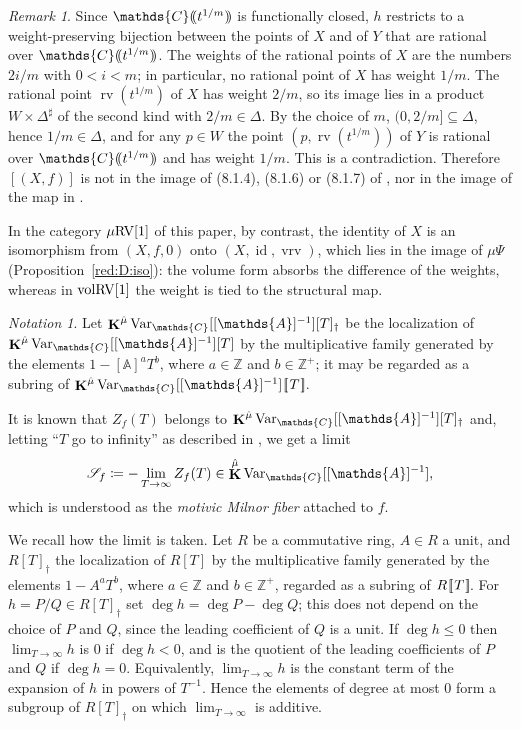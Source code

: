 \documentclass[12pt]{amsart}
\newcommand{\memph}[1]{{\color{magenta}\emph{#1}}}
\theoremstyle{plain}
\theoremstyle{definition}
\theoremstyle{remark}
\newtheorem{rem}[thm]{Remark}
\newtheorem{nota}[thm]{Notation}
\numberwithin{equation}{section}
\theoremstyle{plain}
\newcommand{\RV}{\textup{RV}}
\DeclareMathOperator{\id}{id}
\newcommand{\Z}{\mathds{Z}}
\newcommand{\A}{\mathds{A}}
\newcommand{\C}{\mathds{C}}
\newcommand{\0}{\emptyset}
\newcommand{\dbra}[1]{%
  \,[\mkern-6.8mu[\, #1 \,]\mkern-6.8mu]}
\newcommand{\dpar}[1]{%
   (\mkern-4mu (#1 )\mkern-4mu )}
\newcommand{\limplies}{\rightarrow}
\newcommand{\sub}{\subseteq}
\newcommand{\mgRV}{{\mu}{\RV}}
\DeclareMathOperator{\rv}{rv}
\DeclareMathOperator{\ggk}{\mathbf{K}}
\DeclareMathOperator{\vrv}{vrv}
\newcommand{\var}{\textup{Var}}
\newcommand{\gmv}{\ggk^{\hat \mu}\var_{\C}}
\begin{document}
\begin{rem}
Since $\C\dpar{t^{1/m}}$ is functionally closed, $h$ restricts to a weight-preserving bijection between the points of $X$ and of $Y$ that are rational over $\C\dpar{t^{1/m}}$. The weights of the rational points of $X$ are the numbers $2i/m$ with $0 < i < m$; in particular, no rational point of $X$ has weight $1/m$. The rational point $\rv(t^{1/m})$ of $X$ has weight $2/m$, so its image lies in a product $W \times \Delta^\sharp$ of the second kind with $2/m \in \Delta$. By the choice of $m$, $(0, 2/m] \sub \Delta$, hence $1/m \in \Delta$, and for any $p \in W$ the point $(p, \rv(t^{1/m}))$ of $Y$ is rational over $\C\dpar{t^{1/m}}$ and has weight $1/m$. This is a contradiction. Therefore $[(X, f)]$ is not in the image of (8.1.4), (8.1.6) or (8.1.7) of \cite{hru:loe:lef}, nor in the image of the map in \cite[Proposition~10.10(2)]{hrushovski:kazhdan:integration:vf}.

In the category $\mgRV[1]$ of this paper, by contrast, the identity of $X$ is an isomorphism from $(X, f, 0)$ onto $(X, \id, \vrv)$, which lies in the image of ${\mu}\Psi$ (Proposition~\ref{red:D:iso}): the volume form absorbs the difference of the weights, whereas in $\mathrm{vol}\RV[1]$ the weight is tied to the structural map.
\end{rem}

\begin{nota}\label{dag:loc}
Let $\gmv[[\A]^{-1}][T]_{\dag}$ be the localization of $\gmv[[\A]^{-1}][T]$ by the multiplicative family generated by the elements $1 - [\A]^{a}T^b$, where $a \in \Z$ and $b \in \Z^+$; it may be regarded as a subring of  $\gmv[[\A]^{-1}] \dbra T$.
\end{nota}

It is known that $Z_f(T)$ belongs to $\gmv[[\A]^{-1}][T]_{\dag}$ and, letting ``$T$ go to infinity'' as described in \cite[\S~8.4]{hru:loe:lef}, we get a limit
\[
\mathscr S_f \coloneqq - \lim_{T \limplies \infty} Z_f(T) \in \gmv[[\A]^{-1}],
\]
which is understood as the \memph{motivic Milnor fiber} attached to $f$.

We recall how the limit is taken. Let $R$ be a commutative ring, $A \in R$ a unit, and $R[T]_{\dag}$ the localization of $R[T]$ by the multiplicative family generated by the elements $1 - A^{a}T^b$, where $a \in \Z$ and $b \in \Z^+$, regarded as a subring of $R \dbra T$. For $h = P / Q \in R[T]_{\dag}$ set $\deg h = \deg P - \deg Q$; this does not depend on the choice of $P$ and $Q$, since the leading coefficient of $Q$ is a unit. If $\deg h \leq 0$ then $\lim_{T \limplies \infty} h$ is $0$ if $\deg h < 0$, and is the quotient of the leading coefficients of $P$ and $Q$ if $\deg h = 0$. Equivalently, $\lim_{T \limplies \infty} h$ is the constant term of the expansion of $h$ in powers of $T^{-1}$. Hence the elements of degree at most $0$ form a subgroup of $R[T]_{\dag}$ on which $\lim_{T \limplies \infty}$ is additive.
\end{document}
